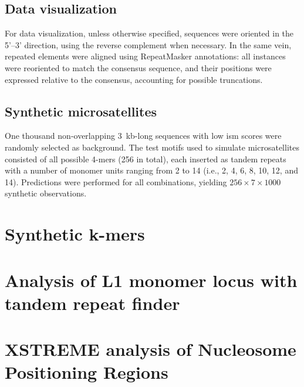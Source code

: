 \documentclass[11pt]{book}
\begin{document}
\section{Data visualization}
For data visualization, unless otherwise specified, sequences were oriented in the 5'–3' direction, using the reverse complement when necessary. In the same vein, repeated elements were aligned using RepeatMasker annotations: all instances were reoriented to match the consensus sequence, and their positions were expressed relative to the consensus, accounting for possible truncations.

\section{Synthetic microsatellites}
One thousand non-overlapping 3~kb-long sequences with low \gls{ism} scores were randomly selected as background. The test motifs used to simulate microsatellites consisted of all possible 4-mers (256 in total), each inserted as tandem repeats with a number of monomer units ranging from 2 to 14 (i.e., 2, 4, 6, 8, 10, 12, and 14). Predictions were performed for all combinations, yielding $256 \times 7 \times 1000$ synthetic observations.

\chapter{Synthetic k-mers}
\label{appendix:synth_genom}


\chapter{Analysis of L1 monomer locus with tandem repeat finder}
\label{appendix:L1_monomers}


\chapter{XSTREME analysis of Nucleosome Positioning Regions}
\label{appendix:xstreme_list}

\end{document}
